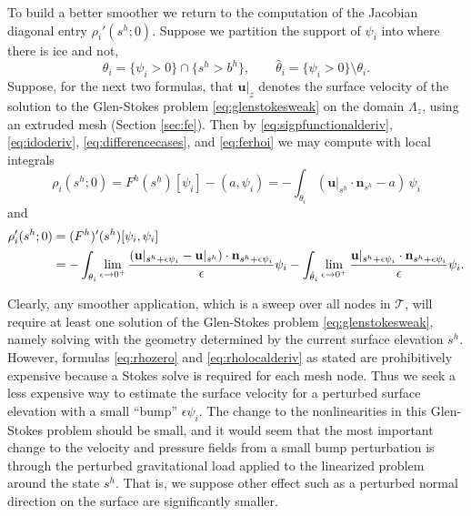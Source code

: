\documentclass[letterpaper,final,12pt,reqno]{amsart}
\theoremstyle{claim}
\newcommand{\eps}{\epsilon}
\newcommand{\bn}{\mathbf{n}}
\newcommand{\bu}{\mathbf{u}}
\newcommand{\ip}[2]{\left(#1,#2\right)}
\numberwithin{equation}{section}
\numberwithin{figure}{section}
\numberwithin{table}{section}
\numberwithin{theorem}{section}
\begin{document}
To build a better smoother we return to the computation of the Jacobian diagonal entry $\rho_i'(s^h; 0)$.  Suppose we partition the support of $\psi_i$ into where there is ice and not,
\begin{equation}
\theta_i = \{\psi_i > 0\} \cap \{s^h > b^h\}, \qquad {\hat\theta}_i = \{\psi_i > 0\} \setminus \theta_i.  \label{eq:thetasupport}
\end{equation}
Suppose, for the next two formulas, that $\bu|_{z}$ denotes the surface velocity of the solution to the Glen-Stokes problem \eqref{eq:glenstokesweak} on the domain $\Lambda_{z}$, using an extruded mesh (Section \ref{sec:fe}).  Then by \eqref{eq:sigpfunctionalderiv}, \eqref{eq:idoderiv}, \eqref{eq:differencecases}, and \eqref{eq:ferhoi} we may compute with local integrals
\begin{equation}
\rho_i(s^h; 0) = F^h(s^h)[\psi_i] - \ip{a}{\psi_i} = - \int_{\theta_i} (\bu|_{s^h} \cdot \bn_{s^h}- a)\, \psi_i  \label{eq:rhozero}
\end{equation}
and
\begin{align}
\rho_i'(s^h; 0) &= (F^h)'(s^h)[\psi_i,\psi_i]  \label{eq:rholocalderiv} \\
  &= - \int_{\theta_i} \lim_{\eps\to 0^+} \frac{(\bu|_{s^h+\eps\psi_i} - \bu|_{s^h}) \cdot \bn_{s^h+\eps\psi_i}}{\eps} \psi_i - \int_{{\hat\theta}_i} \lim_{\eps\to 0^+} \frac{\bu|_{s^h+\eps\psi_i} \cdot \bn_{s^h+\eps\psi_i}}{\eps} \psi_i.  \notag
\end{align}

Clearly, any smoother application, which is a sweep over all nodes in $\mathcal{T}$, will require at least one solution of the Glen-Stokes problem \eqref{eq:glenstokesweak}, namely solving with the geometry determined by the current surface elevation $s^h$.  However, formulas \eqref{eq:rhozero} and \eqref{eq:rholocalderiv} as stated are prohibitively expensive because a Stokes solve is required  for each mesh node.  Thus we seek a less expensive way to estimate the surface velocity for a perturbed surface elevation with a small ``bump'' $\eps\psi_i$.  The change to the nonlinearities in this Glen-Stokes problem should be small, and it would seem that the most important change to the velocity and pressure fields from a small bump perturbation is through the perturbed gravitational load applied to the linearized problem around the state $s^h$.  That is, we suppose other effect such as a perturbed normal direction on the surface are significantly smaller.
\end{document}
